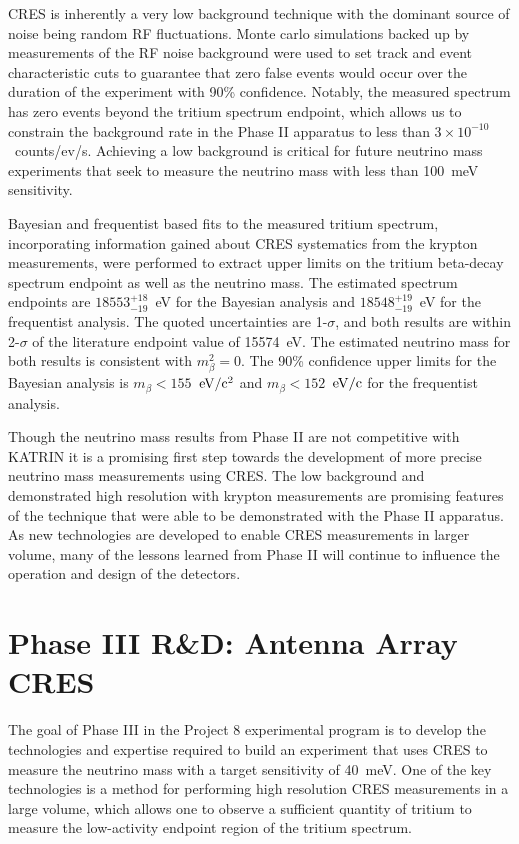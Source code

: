 CRES is inherently a very low background technique with the dominant source of noise being random RF fluctuations. Monte carlo simulations backed up by measurements of the RF noise background were used to set track and event characteristic cuts to guarantee that zero false events would occur over the duration of the experiment with 90\% confidence. Notably, the measured spectrum has zero events beyond the tritium spectrum endpoint, which allows us to constrain the background rate in the Phase II apparatus to less than $3\times10^{-10}$~counts/ev/s. Achieving a low background is critical for future neutrino mass experiments that seek to measure the neutrino mass with less than 100~meV sensitivity.

Bayesian and frequentist based fits to the measured tritium spectrum, incorporating information gained about CRES systematics from the krypton measurements, were performed to extract upper limits on the tritium beta-decay spectrum endpoint as well as the neutrino mass. The estimated spectrum endpoints are $18553^{+18}_{-19}$~eV for the Bayesian analysis and $18548^{+19}_{-19}$~eV for the frequentist analysis. The quoted uncertainties are 1-$\sigma$, and both results are within 2-$\sigma$ of the literature endpoint value of 15574~eV. The estimated neutrino mass for both results is consistent with $m_\beta^2=0$. The 90\% confidence upper limits for the Bayesian analysis is $m_\beta < 155$~$\rm{eV}/\rm{c}^2$ and $m_\beta < 152$~$\rm{eV}/\rm{c}$ for the frequentist analysis.

Though the neutrino mass results from Phase II are not competitive with KATRIN it is a promising first step towards the development of more precise neutrino mass measurements using CRES. The low background and demonstrated high resolution with krypton measurements are promising features of the technique that were able to be demonstrated with the Phase II apparatus. As new technologies are developed to enable CRES measurements in larger volume, many of the lessons learned from Phase II will continue to influence the operation and design of the detectors.

\section{Phase III R\&D: Antenna Array CRES}

The goal of Phase III in the Project 8 experimental program is to develop the technologies and expertise required to build an experiment that uses CRES to measure the neutrino mass with a target sensitivity of 40~meV. One of the key technologies is a method for performing high resolution CRES measurements in a large volume, which allows one to observe a sufficient quantity of tritium to measure the low-activity endpoint region of the tritium spectrum. 

